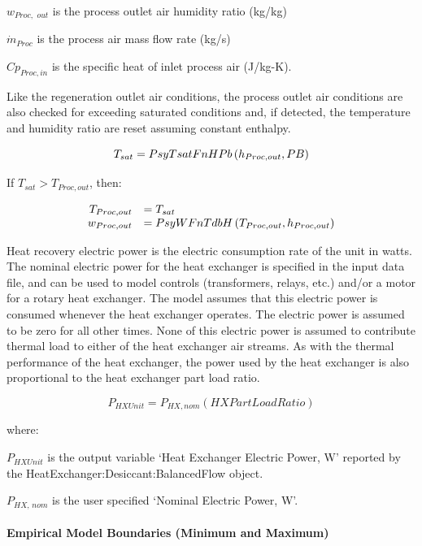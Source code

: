 \({w_{Proc,\,\,out}}\) is the process outlet air humidity ratio (kg/kg)

\({\dot m_{Proc}}\) is the process air mass flow rate (kg/s)

\(C{p_{Proc,in}}\) is the specific heat of inlet process air (J/kg-K).

Like the regeneration outlet air conditions, the process outlet air conditions are also checked for exceeding saturated conditions and, if detected, the temperature and humidity ratio are reset assuming constant enthalpy.

\begin{equation}
  T_{sat} = PsyTsatFnHPb \PB{h_{Proc,out},PB}
\end{equation}

If $T_{sat}>T_{Proc,out}$, then:

\begin{equation}
  \begin{array}{rl}
    T_{Proc,out} &= T_{sat} \\
    w_{Proc,out} &= PsyWFnTdbH \PB{T_{Proc,out},h_{Proc,out}}
  \end{array}
\end{equation}  

Heat recovery electric power is the electric consumption rate of the unit in watts. The nominal electric power for the heat exchanger is specified in the input data file, and can be used to model controls (transformers, relays, etc.) and/or a motor for a rotary heat exchanger. The model assumes that this electric power is consumed whenever the heat exchanger operates. The electric power is assumed to be zero for all other times. None of this electric power is assumed to contribute thermal load to either of the heat exchanger air streams. As with the thermal performance of the heat exchanger, the power used by the heat exchanger is also proportional to the heat exchanger part load ratio.

\begin{equation}
{P_{HXUnit}} = {P_{HX,nom}}\left( {HXPartLoadRatio} \right)
\end{equation}

where:

\({P_{HXUnit}}\) is the output variable `Heat Exchanger Electric Power, W' reported by the HeatExchanger:Desiccant:BalancedFlow object.

\({P_{HX,\,nom}}\) is the user specified `Nominal Electric Power, W'.

\paragraph{Empirical Model Boundaries (Minimum and Maximum)}\label{empirical-model-boundaries-minimum-and-maximum}

